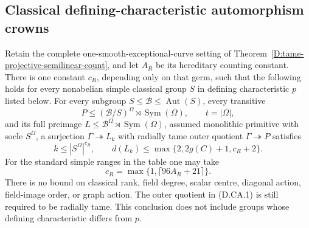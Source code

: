\subsection{Classical defining-characteristic automorphism crowns}

\begin{corollary}
\label{D:classical-defining-characteristic-crowns}
Retain the complete one-smooth-exceptional-curve setting of
Theorem~\ref{D:tame-projective-semilinear-count}, and let
$A_R$ be its hereditary counting constant. There is one
constant $c_R$, depending only on that germ, such that the
following holds for every nonabelian simple classical group
$S$ in defining characteristic $p$ listed below.
For every subgroup
$S\leq\mathcal B\leq\operatorname{Aut}(S)$, every transitive
\[
 P\leq(\mathcal B/S)^\Omega\rtimes\operatorname{Sym}(\Omega),
 \qquad t=|\Omega|,
                                                        \tag{D.CA.1}
\]
and its full preimage
$L\leq\mathcal B^\Omega\rtimes\operatorname{Sym}(\Omega)$,
assumed monolithic primitive with socle $S^\Omega$, a
surjection $\Gamma\twoheadrightarrow L_k$ with radially
tame outer quotient $\Gamma\twoheadrightarrow P$ satisfies
\[
 k\leq |S^\Omega|^{c_R},\qquad
 d(L_k)\leq\max\{2,2g(C)+1,c_R+2\}.                    \tag{D.CA.2}
\]
For the standard simple ranges in the table one may take
\[
                     c_R=\max\{1,\lceil96A_R+21\rceil\}.
                                                        \tag{D.CA.3}
\]
There is no bound on classical rank, field degree, scalar
centre, diagonal action, field-image order, or graph action.
The outer quotient in (D.CA.1) is still required to be
radially tame. This conclusion does not include groups
whose defining characteristic differs from $p$.


\end{corollary}
